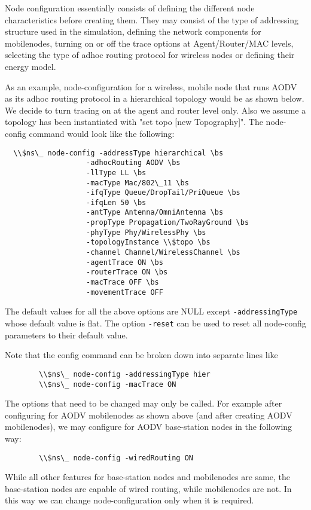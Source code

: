 Node configuration essentially consists of defining the different node
characteristics before creating them. They may consist of the type of
addressing structure used in the simulation, defining the network
components for mobilenodes, turning on or off the trace options at
Agent/Router/MAC levels, selecting the type of adhoc routing protocol for
wireless nodes or defining their energy model.

As an example, node-configuration for a wireless, mobile node that 
runs AODV as its
adhoc routing protocol in a hierarchical topology would be as shown below.
We decide to turn tracing on at the agent and router level only. Also we 
assume a topology has been instantiated with "set topo [new Topography]". 
The node-config command would look like the following:

\begin{verbatim}
  \\$ns\_ node-config -addressType hierarchical \bs 
                   -adhocRouting AODV \bs
                   -llType LL \bs
                   -macType Mac/802\_11 \bs 
                   -ifqType Queue/DropTail/PriQueue \bs
                   -ifqLen 50 \bs
                   -antType Antenna/OmniAntenna \bs 
                   -propType Propagation/TwoRayGround \bs
                   -phyType Phy/WirelessPhy \bs
                   -topologyInstance \\$topo \bs
                   -channel Channel/WirelessChannel \bs 
                   -agentTrace ON \bs 
                   -routerTrace ON \bs
                   -macTrace OFF \bs
                   -movementTrace OFF 
\end{verbatim}

The default values for all the above options are NULL except 
{\tt -addressingType}
whose default value is flat. The option {\tt -reset} can be used to reset all
node-config parameters to their default value.

Note that the config command can be broken down into separate lines like
\begin{verbatim}
        \\$ns\_ node-config -addressingType hier
        \\$ns\_ node-config -macTrace ON
\end{verbatim}
The options that need to be changed may only be called. For example after
configuring for AODV mobilenodes as shown above (and after creating AODV
mobilenodes), we may configure for AODV base-station nodes in the
following way: 
\begin{verbatim}
        \\$ns\_ node-config -wiredRouting ON
\end{verbatim}
While all other features for base-station nodes and mobilenodes are same,
the base-station nodes are capable of wired routing, while mobilenodes are
not. In this way we can change node-configuration only when it is required.

